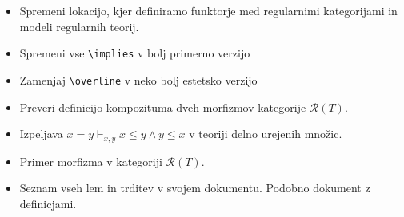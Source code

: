 \documentclass[a4paper]{article}
\begin{document}
    \begin{itemize}
        \item Spremeni lokacijo, kjer definiramo funktorje med regularnimi kategorijami in modeli regularnih teorij.
        \item Spremeni vse \verb|\implies| v bolj primerno verzijo
        \item Zamenjaj \verb|\overline| v neko bolj estetsko verzijo
        \item Preveri definicijo kompozituma dveh morfizmov kategorije $\mathcal{R}(T)$.
        \item Izpeljava $x = y \vdash_{x,y} x \leq y \wedge y \leq x$ v teoriji delno urejenih množic.
        \item Primer morfizma v kategoriji $\mathcal{R}(T)$.
        \item Seznam vseh lem in trditev v svojem dokumentu. Podobno dokument z definicjami.
    \end{itemize}
\end{document}
